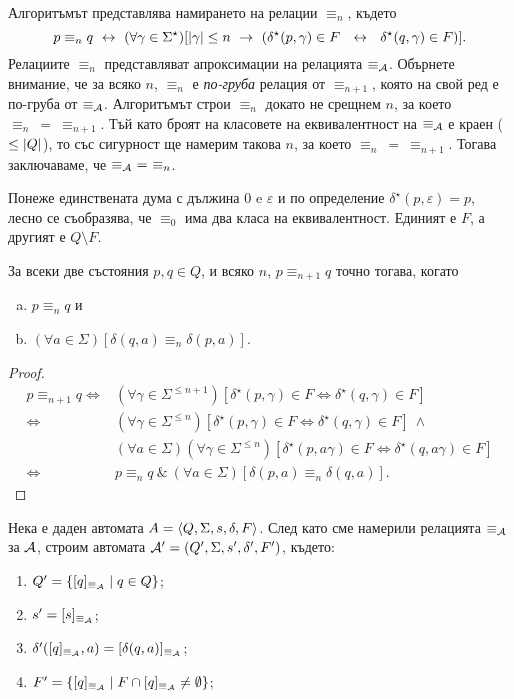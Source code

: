 Алгоритъмът представлява намирането на релации $\equiv_n$, където
\[p\equiv_n q \iff (\forall\gamma\in\Sigma^\star)[\abs{\gamma}\leq n\ \rightarrow\ (\delta^\star(p,\gamma) \in F\ \iff\ \delta^\star(q,\gamma) \in F)].\]
Релациите $\equiv_n$ представляват апроксимации на релацията $\equiv_{\mathcal{A}}$.
Обърнете внимание, че за всяко $n$, $\equiv_n$ е {\em по-груба} релация от $\equiv_{n+1}$, 
която на свой ред е по-груба от $\equiv_{\mathcal{A}}$.
Алгоритъмът строи $\equiv_n$ докато не срещнем $n$, за което $\equiv_n\ =\ \equiv_{n+1}$.
Тъй като броят на класовете на еквивалентност на $\equiv_{\mathcal{A}}$ е краен ($\leq \lvert{Q}\rvert$), то 
със сигурност ще намерим такова $n$, за което $\equiv_n\ =\ \equiv_{n+1}$.
Тогава заключаваме, че $\equiv_\A\ =\ \equiv_n$.

Понеже единствената дума с дължина $0$ e $\varepsilon$ и по определение $\delta^\star(p,\varepsilon) = p$, 
лесно се съобразява, че $\equiv_0$ има два класа на еквивалентност.
Единият е $F$, а другият е $Q\setminus F$.

\begin{prop}
  За всеки две състояния $p,q \in Q$, и всяко $n$, $p \equiv_{n+1} q$ точно тогава, когато
  \begin{enumerate}[a)]
  \item
    $p \equiv_{n} q$ и
  \item
    $(\forall a \in \Sigma)[\delta(q,a) \equiv_{n} \delta(p,a)]$.
  \end{enumerate}
\end{prop}
\begin{proof}
  \begin{align*}
    p \equiv_{n+1} q \iff & (\forall \gamma\in\Sigma^{\leq n+1})[\delta^\star(p,\gamma)\in F \iff \delta^\star(q,\gamma) \in F]\\
    \iff & (\forall \gamma\in\Sigma^{\leq n})[\delta^\star(p,\gamma)\in F \iff \delta^\star(q,\gamma) \in F]\ \wedge\ \\
    & (\forall a\in\Sigma)(\forall \gamma\in\Sigma^{\leq n})[\delta^\star(p, a\gamma)\in F \iff \delta^\star(q, a\gamma) \in F]\\
    \iff & p \equiv_n q\ \&\ (\forall a\in\Sigma)[\delta(p,a) \equiv_n \delta(q,a)].
  \end{align*}
\end{proof}

Нека е даден автомата $A = \langle{Q,\Sigma,s,\delta,F}\rangle$.
След като сме намерили релацията $\equiv_{\mathcal{A}}$ за $\mathcal{A}$, 
строим автомата $\mathcal{A}' = (Q',\Sigma,s',\delta',F')$, където:
\begin{enumerate}[1)]
\item
  $Q' = \{[q]_{\equiv_{\mathcal{A}}} \mid q\in Q\}$;
\item
  $s' = [s]_{\equiv_{\mathcal{A}}}$;
\item
  $\delta'([q]_{\equiv_{\mathcal{A}}}, a) = [\delta(q,a)]_{\equiv_{\mathcal{A}}}$;
\item
  $F' = \{[q]_{\equiv_{\mathcal{A}}}\mid F\cap [q]_{\equiv_{\mathcal{A}}} \neq \emptyset\}$;
\end{enumerate}

